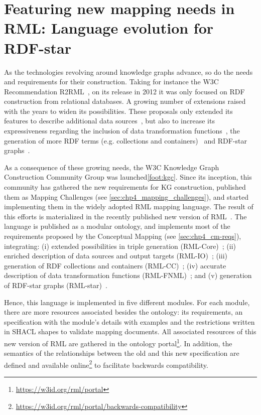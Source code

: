 \section{Featuring new mapping needs in RML: Language evolution for RDF-star}
\label{sec:chp4_rml_star}

As the technologies revolving around knowledge graphs advance, so do the needs and requirements for their construction. Taking for instance the W3C Recommendation R2RML~\cite{das2012r2rml}, on its release in 2012 it was only focused on RDF construction from relational databases. A growing number of extensions raised with the years to widen its possibilities. These proposals only extended its features to describe additional data sources~\cite{DBLP:conf/webist/MichelDFM15,VanAssche2021LeveragingWebThings}, but also to increase its expressiveness regarding the inclusion of data transformation functions~\cite{de2020implementation,debruyne2016r2rmlf,junior2016funul,kyzirakos2018geotriples}, the generation of more RDF terms (e.g. collections and containers)~\cite{DBLP:conf/webist/MichelDFM15,DBLP:conf/ercimdl/DebruyneMO17} and RDF-star graphs~\cite{delva2021rml-star,sundqvist2022extending}. 

As a consequence of these growing needs, the W3C Knowledge Graph Construction Community Group was launched\cref{foot:kgc}. Since its inception, this community has gathered the new requirements for KG construction, published them as Mapping Challenges (see \cref{sec:chp4_mapping_challenges}), and started implementing them in the widely adopted RML mapping language. The result of this efforts is materialized in the recently published new version of RML~\cite{iglesias2023rml}. The language is published as a modular ontology, and implements most of the requirements proposed by the Conceptual Mapping (see \cref{sec:chp4_cm-reqs}), integrating: (i) extended possibilities in triple generation (RML-Core)~\cite{core_ontology}; (ii) enriched description of data sources and output targets (RML-IO)~\cite{io_ontology}; (iii) generation of RDF collections and containers (RML-CC)~\cite{cc_ontology}; (iv) accurate description of data transformation functions (RML-FNML)~\cite{fnml_ontology}; and (v) generation of RDF-star graphs (RML-star)~\cite{star_ontology}.

Hence, this language is implemented in five different modules. 
For each module, there are more resources associated besides the ontology: its requirements, an specification with the module's details with examples and the restrictions written in SHACL shapes to validate mapping documents. 
All associated resources of this new version of RML are gathered in the ontology portal\footnote{\url{https://w3id.org/rml/portal}}. 
In addition, the semantics of the relationships between the old and this new specification are defined and available online\footnote{\url{https://w3id.org/rml/portal/backwards-compatibility}} to facilitate backwards compatibility.

